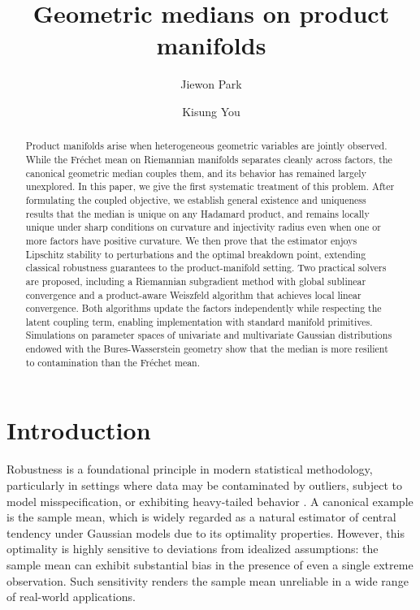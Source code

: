 \documentclass[10pt]{article}
\newcommand{\Frechet}{Fr\'{e}chet\xspace}
\begin{document}
\title{Geometric medians on product manifolds}
\author[1]{Jiewon Park}
\author[2]{Kisung You}

\date{}
\maketitle
\begin{abstract}
	Product manifolds arise when heterogeneous geometric variables are jointly observed. While the \Frechet mean on Riemannian manifolds separates cleanly across factors, the canonical geometric median couples them, and its behavior has remained largely unexplored. In this paper, we give the first systematic treatment of this problem. After formulating the coupled objective, we establish general existence and uniqueness results that the median is unique on any Hadamard product, and remains locally unique under sharp conditions on curvature and injectivity radius even when one or more factors have positive curvature. We then prove that the estimator enjoys Lipschitz stability to perturbations and the optimal breakdown point, extending classical robustness guarantees to the product-manifold setting. Two practical solvers are proposed, including a Riemannian subgradient method with global sublinear convergence and a product-aware Weiszfeld algorithm that achieves local linear convergence. Both algorithms update the factors independently while respecting the latent coupling term, enabling implementation with standard manifold primitives. Simulations on parameter spaces of univariate and multivariate Gaussian distributions endowed with the Bures-Wasserstein geometry show that the median is more resilient to contamination than the \Frechet mean. 
\end{abstract}


\section{Introduction}

Robustness is a foundational principle in modern statistical methodology, particularly in settings where data may be contaminated by outliers, subject to model misspecification, or exhibiting heavy-tailed behavior \cite{huber_1981_RobustStatistics}. A canonical example is the sample mean, which is widely regarded as a natural estimator of central tendency under Gaussian models due to its optimality properties. However, this optimality is highly sensitive to deviations from idealized assumptions: the sample mean can exhibit substantial bias in the presence of even a single extreme observation. Such sensitivity renders the sample mean unreliable in a wide range of real-world applications.
\end{document}
